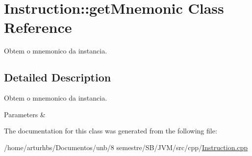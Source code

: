 \hypertarget{classInstruction_1_1getMnemonic}{}\section{Instruction\+:\+:get\+Mnemonic Class Reference}
\label{classInstruction_1_1getMnemonic}


Obtem o mnemonico da instancia.  




\subsection{Detailed Description}
Obtem o mnemonico da instancia. 


\begin{DoxyParams}{Parameters}
{\em } & \\
\hline
\end{DoxyParams}


The documentation for this class was generated from the following file\+:\begin{DoxyCompactItemize}
\item 
/home/arturhbs/\+Documentos/unb/8 semestre/\+S\+B/\+J\+V\+M/src/cpp/\hyperlink{Instruction_8cpp}{Instruction.\+cpp}\end{DoxyCompactItemize}
